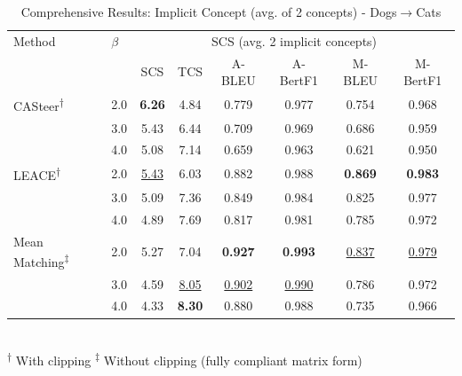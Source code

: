 \begin{table}[htbp]
\centering
\caption{Comprehensive Results: Implicit Concept (avg. of 2 concepts) - Dogs$\to$Cats}
\label{tab:implicitconcept_man_s_best_friend_dogstocats_avg2}
\begin{tabular}{l|l|cccccc|}
\hline
Method & $\beta$ & \multicolumn{6}{c|}{SCS (avg. 2 implicit concepts)} \\
 &  & SCS & TCS & A-BLEU & A-BertF1 & M-BLEU & M-BertF1 \\
\hline
CASteer\textsuperscript{†} & 2.0 & \textbf{6.26} & 4.84 & 0.779 & 0.977 & 0.754 & 0.968 \\
 & 3.0 & 5.43 & 6.44 & 0.709 & 0.969 & 0.686 & 0.959 \\
 & 4.0 & 5.08 & 7.14 & 0.659 & 0.963 & 0.621 & 0.950 \\
\hline
LEACE\textsuperscript{†} & 2.0 & \underline{5.43} & 6.03 & 0.882 & 0.988 & \textbf{0.869} & \textbf{0.983} \\
 & 3.0 & 5.09 & 7.36 & 0.849 & 0.984 & 0.825 & 0.977 \\
 & 4.0 & 4.89 & 7.69 & 0.817 & 0.981 & 0.785 & 0.972 \\
\hline
Mean Matching\textsuperscript{‡} & 2.0 & 5.27 & 7.04 & \textbf{0.927} & \textbf{0.993} & \underline{0.837} & \underline{0.979} \\
 & 3.0 & 4.59 & \underline{8.05} & \underline{0.902} & \underline{0.990} & 0.786 & 0.972 \\
 & 4.0 & 4.33 & \textbf{8.30} & 0.880 & 0.988 & 0.735 & 0.966 \\
\hline
\end{tabular}
\\[0.5em]
\footnotesize
\textsuperscript{†} With clipping \quad \textsuperscript{‡} Without clipping (fully compliant matrix form)
\end{table}